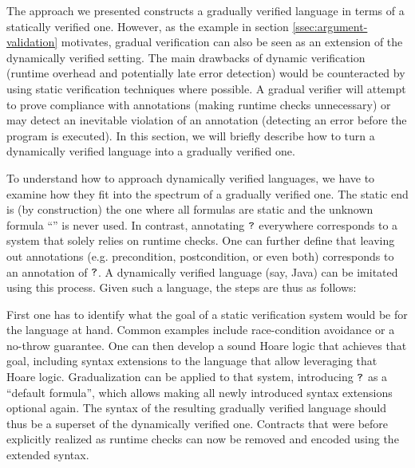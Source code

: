 The approach we presented constructs a gradually verified language in terms of a statically verified one.
However, as the example in section \ref{ssec:argument-validation} motivates, gradual verification can also be seen as an extension of the dynamically verified setting.
The main drawbacks of dynamic verification (runtime overhead and potentially late error detection) would be counteracted by using static verification techniques where possible.
A gradual verifier will attempt to prove compliance with annotations (making runtime checks unnecessary) or may detect an inevitable violation of an annotation (detecting an error before the program is executed).
In this section, we will briefly describe how to turn a dynamically verified language into a gradually verified one.

To understand how to approach dynamically verified languages, we have to examine how they fit into the spectrum of a gradually verified one.
The static end is (by construction) the one where all formulas are static and the unknown formula “\qm” is never used.
In contrast, annotating $\textup{\texttt{?}}$ everywhere corresponds to a system that solely relies on runtime checks.
One can further define that leaving out annotations (e.g. precondition, postcondition, or even both) corresponds to an annotation of $\textup{\texttt{?}}$.
A dynamically verified language (say, Java) can be imitated using this process.
Given such a language, the steps are thus as follows:

First one has to identify what the goal of a static verification system would be for the language at hand.
Common examples include race-condition avoidance or a no-throw guarantee.
One can then develop a sound Hoare logic that achieves that goal, including syntax extensions to the language that allow leveraging that Hoare logic.
Gradualization can be applied to that system, introducing $\textup{\texttt{?}}$ as a “default formula”, which allows making all newly introduced syntax extensions optional again.
The syntax of the resulting gradually verified language should thus be a superset of the dynamically verified one.
Contracts that were before explicitly realized as runtime checks can now be removed and encoded using the extended syntax.